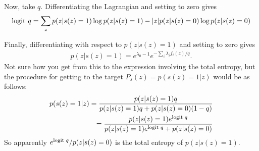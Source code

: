 \bigskip
Now, take $q$. Differentiating the Lagrangian and setting to zero gives
\begin{eqnarray*}
    \textup{logit } q = \sum_z p(z|s(z)=1) \log p(z|s(z)=1)-|z| p(z|s(z)=0) \log p(z|s(z)=0)
\end{eqnarray*}

\bigskip
Finally, differentiating with respect to $p(z|s(z)=1)$ and setting to zero gives
\begin{eqnarray*}
    p(z|s(z)=1)=e^{\lambda_0-1}e^{-\sum_i \lambda_i f_i(z)/q}.
\end{eqnarray*}
Not sure how you get from this to the expression involving the total entropy, but the procedure for getting to the target $P_s(z)=p(s(z)=1|z)$ would be as follows:
\begin{eqnarray*}
    p(s(z)=1|z) = \frac{p(z|s(z)=1)q}{p(z|s(z)=1)q+p(z|s(z)=0)(1-q)}\\
    =\frac{p(z|s(z)=1)e^{\textup{logit } q}}{p(z|s(z)=1)e^{\textup{logit } q} + p(z|s(z)=0)}
\end{eqnarray*}
So apparently $e^{\textup{logit }q}/p(z|s(z)=0)$ is the total entropy of $p(z|s(z)=1)$.
